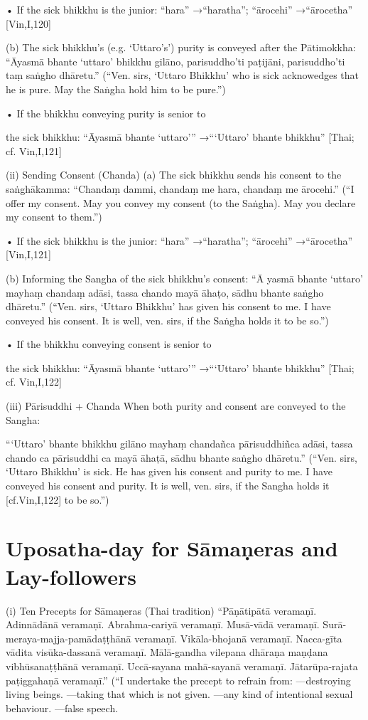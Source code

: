 • If the sick bhikkhu is the junior:
“hara” →“haratha”; “ārocehi” →“ārocetha”
[Vin,I,120]

(b) The sick bhikkhu’s (e.g. ‘Uttaro’s’)
purity is conveyed after the Pātimokkha:
“Āyasmā bhante ‘uttaro’ bhikkhu gilāno,
parisuddho’ti paṭijāni,
parisuddho’ti taṃ saṅgho dhāretu.”
(“Ven. sirs, ‘Uttaro Bhikkhu’ who is sick acknowedges
that he is pure. May the Saṅgha hold him to be pure.”)

• If the bhikkhu conveying purity is senior to

the sick bhikkhu:
“Āyasmā bhante ‘uttaro’”
→“‘Uttaro’ bhante bhikkhu”
[Thai; cf. Vin,I,121]

(ii) Sending Consent (Chanda)
(a) The sick bhikkhu sends his consent to
the saṅghākamma:
“Chandaṃ dammi,
chandaṃ me hara,
chandaṃ me ārocehi.”
(“I offer my consent. May you convey my consent (to
the Saṅgha). May you declare my consent to them.”)

• If the sick bhikkhu is the junior:
“hara” →“haratha”; “ārocehi” →“ārocetha”
[Vin,I,121]

(b) Informing the Sangha of the sick
bhikkhu’s consent:
“Ā yasmā bhante ‘uttaro’
mayhaṃ chandaṃ adāsi,
tassa chando mayā āhaṭo,
sādhu bhante saṅgho dhāretu.”
(“Ven. sirs, ‘Uttaro Bhikkhu’ has given his consent to
me. I have conveyed his consent. It is well, ven. sirs, if
the Saṅgha holds it to be so.”)

• If the bhikkhu conveying consent is senior to

the sick bhikkhu:
“Āyasmā bhante ‘uttaro’”
→“‘Uttaro’ bhante bhikkhu”
[Thai; cf. Vin,I,122]

(iii) Pārisuddhi + Chanda
When both purity and consent are conveyed to
the Sangha:

“‘Uttaro’ bhante bhikkhu gilāno mayhaṃ
chandañca pārisuddhiñca adāsi,
tassa chando ca pārisuddhi ca mayā āhaṭā,
sādhu bhante saṅgho dhāretu.”
(“Ven. sirs, ‘Uttaro Bhikkhu’ is sick. He has given his
consent and purity to me. I have conveyed his consent
and purity. It is well, ven. sirs, if the Sangha holds it
[cf.Vin,I,122]
to be so.”)

\section{Uposatha-day for Sāmaṇeras and Lay-followers}

(i) Ten Precepts for Sāmaṇeras (Thai tradition)
“Pāṇātipātā veramaṇī.
Adinnādānā veramaṇī.
Abrahma-cariyā veramaṇī.
Musā-vādā veramaṇī.
Surā-meraya-majja-pamādaṭṭhānā veramaṇī.
Vikāla-bhojanā veramaṇī.
Nacca-gīta vādita visūka-dassanā veramaṇī.
Mālā-gandha vilepana dhāraṇa maṇḍana
vibhūsanaṭṭhānā veramaṇī.
Uccā-sayana mahā-sayanā veramaṇī.
Jātarūpa-rajata paṭiggahaṇā veramaṇī.”
(“I undertake the precept to refrain from:
—destroying living beings.
—taking that which is not given.
—any kind of intentional sexual behaviour.
—false speech.

